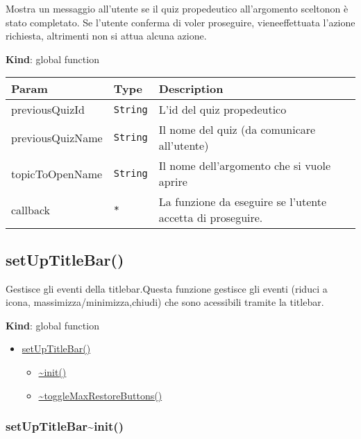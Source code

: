 Mostra un messaggio all'utente se il quiz propedeutico all'argomento
sceltonon è stato completato. Se l'utente conferma di voler proseguire,
vieneeffettuata l'azione richiesta, altrimenti non si attua alcuna
azione.

\textbf{Kind}: global function

\begin{tabularx}{\textwidth}{XXX}
\toprule
Param & Type & Description\tabularnewline
\midrule
\endhead
previousQuizId & \texttt{String} & L'id del quiz
propedeutico\tabularnewline
previousQuizName & \texttt{String} & Il nome del quiz (da comunicare
all'utente)\tabularnewline
topicToOpenName & \texttt{String} & Il nome dell'argomento che si vuole
aprire\tabularnewline
callback & \texttt{*} & La funzione da eseguire se l'utente accetta di
proseguire.\tabularnewline
\bottomrule
\end{tabularx}

\protect\hypertarget{setUpTitleBar}{}{}

\hypertarget{setuptitlebar}{%
\subsection{setUpTitleBar()}\label{setuptitlebar}}

Gestisce gli eventi della titlebar.Questa funzione gestisce gli eventi
(riduci a icona, massimizza/minimizza,chiudi) che sono acessibili
tramite la titlebar.

\textbf{Kind}: global function

\begin{itemize}
\tightlist
\item
  \protect\hyperlink{setUpTitleBar}{setUpTitleBar()}

  \begin{itemize}
  \tightlist
  \item
    \protect\hyperlink{setUpTitleBar..init}{\textasciitilde init()}
  \item
    \protect\hyperlink{setUpTitleBar..toggleMaxRestoreButtons}{\textasciitilde toggleMaxRestoreButtons()}
  \end{itemize}
\end{itemize}

\protect\hypertarget{setUpTitleBar..init}{}{}

\hypertarget{setuptitlebarinit}{%
\subsubsection{setUpTitleBar\textasciitilde init()}\label{setuptitlebarinit}}

